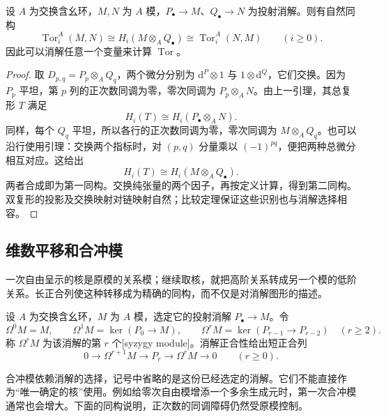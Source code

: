 \begin{proposition}\label{g5:prop:tor-balanced}
	设 \(A\) 为交换含幺环，\(M,N\) 为 \(A\) 模，\(P_\bullet\to M\)、\(Q_\bullet\to N\) 为投射消解。则有自然同构
	\[
		\operatorname{Tor}_i^A(M,N)
		\cong H_i(M\otimes_A Q_\bullet)
		\cong\operatorname{Tor}_i^A(N,M)
		\qquad(i\geq0).
	\]
	因此可以消解任意一个变量来计算 \(\operatorname{Tor}\)。
\end{proposition}
\begin{proof}
	取 \(D_{p,q}=P_p\otimes_A Q_q\)，两个微分分别为 \(\mathrm{d}^P\otimes1\) 与 \(1\otimes \mathrm{d}^Q\)，它们交换。因为 \(P_p\) 平坦，第 \(p\) 列的正次数同调为零，零次同调为 \(P_p\otimes_A N\)。由上一引理，其总复形 \(T\) 满足
	\[
		H_i(T)\cong H_i(P_\bullet\otimes_A N).
	\]
	同样，每个 \(Q_q\) 平坦，所以各行的正次数同调为零，零次同调为 \(M\otimes_A Q_q\)。也可以沿行使用引理：交换两个指标时，对 \((p,q)\) 分量乘以 \((-1)^{pq}\)，便把两种总微分相互对应。这给出
	\[
		H_i(T)\cong H_i(M\otimes_A Q_\bullet).
	\]
	两者合成即为第一同构。交换纯张量的两个因子，再按定义计算，得到第二同构。双复形的投影及交换映射对链映射自然；比较定理保证这些识别也与消解选择相容。
\end{proof}

\subsection{维数平移和合冲模}
\label{g5:subsec:0801:04}

一次自由呈示的核是原模的关系模；继续取核，就把高阶关系转成另一个模的低阶关系。长正合列使这种转移成为精确的同构，而不仅是对消解图形的描述。

\begin{definition}\label{g5:def:syzygy-module}
	设 \(A\) 为交换含幺环，\(M\) 为 \(A\) 模，选定它的投射消解 \(P_\bullet\to M\)。令
	\[
		\Omega^0M=M,\qquad
		\Omega^1M=\ker(P_0\to M),\qquad
		\Omega^rM=\ker(P_{r-1}\to P_{r-2})\quad(r\geq2).
	\]
	称 \(\Omega^rM\) 为该消解的第 \(r\) 个[syzygy module]。消解正合性给出短正合列
	\[
		0\longrightarrow\Omega^{r+1}M\longrightarrow P_r
		\longrightarrow\Omega^rM\longrightarrow0
		\qquad(r\geq0).
	\]
\end{definition}

合冲模依赖消解的选择，记号中省略的是这份已经选定的消解。它们不能直接作为“唯一确定的核”使用。例如给零次自由模增添一个多余生成元时，第一次合冲模通常也会增大。下面的同构说明，正次数的同调障碍仍然受原模控制。

